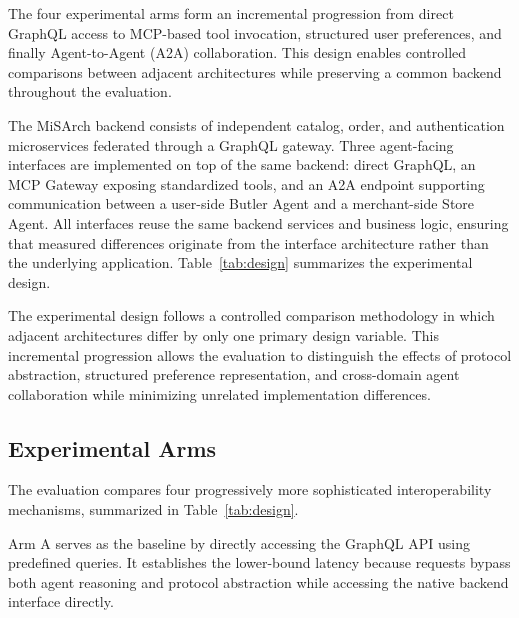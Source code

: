 \documentclass[conference]{IEEEtran}
\begin{document}
The four experimental arms form an incremental progression from direct
GraphQL access to MCP-based tool invocation, structured user preferences, and
finally Agent-to-Agent (A2A) collaboration. This design enables controlled
comparisons between adjacent architectures while preserving a common backend
throughout the evaluation.

The MiSArch backend consists of independent catalog, order, and
authentication microservices federated through a GraphQL gateway. Three
agent-facing interfaces are implemented on top of the same backend: direct
GraphQL, an MCP Gateway exposing standardized tools, and an A2A endpoint
supporting communication between a user-side Butler Agent and a merchant-side
Store Agent. All interfaces reuse the same backend services and business
logic, ensuring that measured differences originate from the interface
architecture rather than the underlying application. Table~\ref{tab:design}
summarizes the experimental design.

The experimental design follows a controlled comparison methodology in which
adjacent architectures differ by only one primary design variable. This
incremental progression allows the evaluation to distinguish the effects of
protocol abstraction, structured preference representation, and cross-domain
agent collaboration while minimizing unrelated implementation differences.

\subsection{Experimental Arms}

The evaluation compares four progressively more sophisticated interoperability
mechanisms, summarized in Table~\ref{tab:design}.

Arm A serves as the baseline by directly accessing the GraphQL API using
predefined queries. It establishes the lower-bound latency because requests
bypass both agent reasoning and protocol abstraction while accessing the
native backend interface directly.
\end{document}
